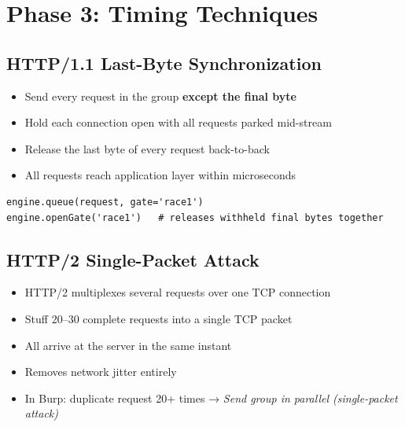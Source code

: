 \documentclass[11pt]{article}
\begin{document}
\section{Phase 3: Timing Techniques}

\subsection{HTTP/1.1 Last-Byte Synchronization}

\begin{techniquebox}
\begin{itemize}
    \item Send every request in the group \textbf{except the final byte}
    \item Hold each connection open with all requests parked mid-stream
    \item Release the last byte of every request back-to-back
    \item All requests reach application layer within microseconds
\end{itemize}
\end{techniquebox}

\begin{lstlisting}[style=code]
engine.queue(request, gate='race1')
engine.openGate('race1')   # releases withheld final bytes together
\end{lstlisting}

\subsection{HTTP/2 Single-Packet Attack}

\begin{techniquebox}
\begin{itemize}
    \item HTTP/2 multiplexes several requests over one TCP connection
    \item Stuff 20–30 complete requests into a single TCP packet
    \item All arrive at the server in the same instant
    \item Removes network jitter entirely
    \item In Burp: duplicate request 20+ times → \textit{Send group in parallel (single-packet attack)}
\end{itemize}
\end{techniquebox}
\end{document}
